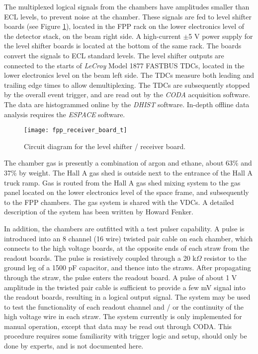 The multiplexed logical signals from the chambers have amplitudes
smaller than ECL levels, to prevent noise at the chamber.
These signals are fed to level shifter boards 
(see Figure \ref{fig:receiverboard}),
located in the FPP rack on
the lower electronics level of the detector stack, on the beam right side.
A high-current $\pm$5 V power supply for the level shifter boards is
located at the bottom of the same rack.
The boards convert the signals to ECL standard levels.
The level shifter outputs
are connected to the starts of {\em LeCroy} Model 1877 FASTBUS TDCs, located
in the lower electronics level on the beam left side.
The TDCs measure both leading and trailing edge times to allow demultiplexing.
The TDCs are subsequently stopped by the overall event trigger, and
are read out by the {\it CODA} acquisition software.
The data are histogrammed online by the {\it DHIST} software.
In-depth offline data analysis requires the {\it ESPACE} software.

\begin{figure}
\begin{center}
\texttt{[image: fpp\_receiver\_board\_t]}
{\linespread{1.}
\caption[Detectors: FPP Level Shifter Receiver Board]{Circuit diagram for the level shifter / receiver board.}
\label{fig:receiverboard}}
\end{center}
\end{figure}


The chamber gas is presently a combination of argon and ethane,
about 63\% and 37\% by weight. The Hall A gas shed is outside
next to the entrance of the Hall A truck ramp.
Gas is routed from the Hall A gas shed mixing system to the gas panel
located on the lower electronics level of the space frame, and subsequently
to the FPP chambers.
The gas system is shared with the VDCs.
A detailed description of the system has been written by
Howard Fenker.

In addition, the chambers are outfitted with a test pulser capability.
A pulse is introduced into an 8 channel (16 wire) twisted pair cable
on each chamber, which connects to the high voltage boards,
at the opposite ends of each straw from the readout boards.
The pulse is resistively coupled through a 20 k$\Omega$ resistor
to the ground leg of a 1500 pF capacitor, and thence into the
straws.
After propagating through the straw, the pulse enters the readout board.
A pulse of about 1 V amplitude in the twisted pair cable is sufficient to
provide a few mV signal into the readout boards, resulting in a logical
output signal.
The system may be used to test the functionality of each readout channel
and / or the continuity of the high voltage wire in each straw.
The system currently is only implemented for manual operation, except
that data may be read out through CODA.
This procedure requires some familiarity with trigger logic and setup,
should only be done by experts, and is not documented here.

